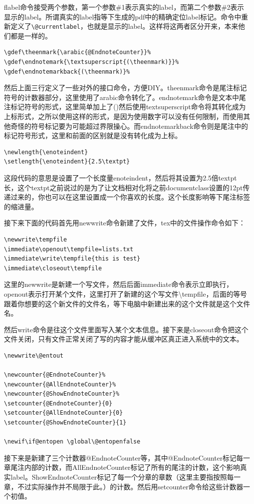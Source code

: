 \documentclass[12pt,oneside]{book}
\newlength{\textpt}
\begin{document}
\begin{common-format}
flabel命令接受两个参数，第一个参数\#{}1表示真实的label，而第二个参数\#{}2表示显示的label。所谓真实的label指等下生成的pdf中的精确定位label标记。命令中重新定义了\verb+\@currentlabel+，也就是显示的label。这样将这两者区分开来，本来他们都是一样的。



\begin{Verbatim}
\gdef\theenmark{\arabic{@EndnoteCounter}}%
\gdef\endnotemark{\textsuperscript{(\theenmark)}}%
\gdef\endnotemarkback{(\theenmark)}%
\end{Verbatim}
然后上面三行定义了一些对外的接口命令，方便DIY。theenmark命令是尾注标记符号的计数器部分，这里使用了arabic命令转化了。endnotemark命令是文本中尾注标记符号的形式，这里简单加上了()然后使用textsuperscript命令将其转化成为上标形式，之所以使用这样的形式，是因为使用数字可以没有任何限制，而使用其他奇怪的符号标记要为可能超过界限操心。而endnotemarkback命令则是尾注中的标记符号形式，这里和前面的区别就是没有转化成为上标。

\begin{Verbatim}
\newlength{\enoteindent}
\setlength{\enoteindent}{2.5\textpt}
\end{Verbatim}
这段代码的意思是设置了一个长度量enoteindent，然后将其设置为2.5倍textpt长，这个textpt之前说过的是为了让文档相对化将之前documentclass设置的12pt传递过来的，你也可以在这里设置成一个你喜欢的长度。这个长度影响等下尾注标签的缩进量。


接下来下面的代码首先用newwrite命令新建了文件，tex中的文件操作命令如下：
\begin{Verbatim}
\newwrite\tempfile
\immediate\openout\tempfile=lists.txt
\immediate\write\tempfile{this is test}
\immediate\closeout\tempfile
\end{Verbatim}
这里的newwrite是新建一个写文件，然后后面immediate命令表示立即执行，openout表示打开某个文件，这里打开了新建的这个写文件\textbackslash tempfile，后面的等号跟着你想要的这个新文件的文件名，等下电脑中新建出来的这个文件就是这个文件名。

然后write命令是往这个文件里面写入某个文本信息。接下来是closeout命令把这个文件关闭，只有文件正常关闭了写的内容才能从缓冲区真正进入系统中的文本。


\begin{Verbatim}
\newwrite\@entout

\newcounter{@EndnoteCounter}%
\newcounter{@AllEndnoteCounter}%
\newcounter{@ShowEndnoteCounter}%
\setcounter{@EndnoteCounter}{0}
\setcounter{@AllEndnoteCounter}{0}
\setcounter{@ShowEndnoteCounter}{1}

\newif\if@entopen \global\@entopenfalse
\end{Verbatim}
接下来是新建了三个计数器@EndnoteCounter等，其中@EndnoteCounter标记每一章尾注内部的计数，而AllEndnoteCounter标记了所有的尾注的计数，这个影响真实label。ShowEndnoteCounter标记了每一个分章的章数（这里主要指按照每一章，不过实际操作并不局限于此。）的计数。然后用setcounter命令给这些计数器一个初值。


\end{common-format}
\end{document}
